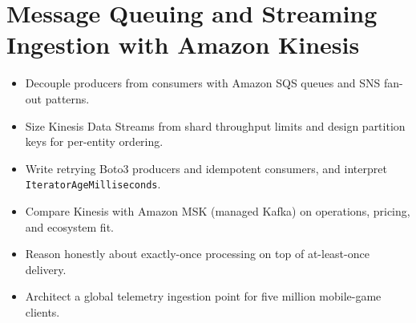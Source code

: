 \chapter{Message Queuing and Streaming Ingestion with Amazon Kinesis}
%
\begin{objectives}
\begin{itemize}
    \item Decouple producers from consumers with Amazon SQS queues and SNS fan-out patterns.
    \item Size Kinesis Data Streams from shard throughput limits and design partition keys for per-entity ordering.
    \item Write retrying Boto3 producers and idempotent consumers, and interpret \texttt{IteratorAgeMilliseconds}.
    \item Compare Kinesis with Amazon MSK (managed Kafka) on operations, pricing, and ecosystem fit.
    \item Reason honestly about exactly-once processing on top of at-least-once delivery.
    \item Architect a global telemetry ingestion point for five million mobile-game clients.
\end{itemize}
\end{objectives}


